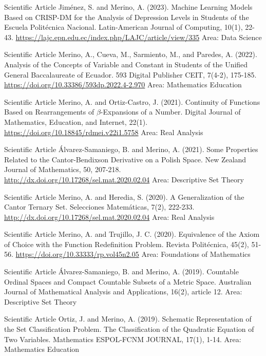 \documentclass[
    a4paper,
    maincolor=cvblue!70!blue,
    sidecolor=gray!30,
    sectioncolor=cvblue!70!blue,
    sidebarwidth=7.5cm,
    topbottommargin=20pt,
    leftrightmargin=20pt,
]{fortysecondscv}
\begin{document}
    {Scientific Article}
    {Jiménez, S. and Merino, A. (2023). Machine Learning Models Based on CRISP-DM for the Analysis of Depression Levels in Students of the Escuela Politécnica Nacional. Latin-American Journal of Computing, 10(1), 22-43.}     
    {\url{https://lajc.epn.edu.ec/index.php/LAJC/article/view/335}}
    {Area: Data Science}
    
    {Scientific Article}
    {Merino, A., Cueva, M., Sarmiento, M., and Paredes, A. (2022). Analysis of the Concepts of Variable and Constant in Students of the Unified General Baccalaureate of Ecuador. 593 Digital Publisher CEIT, 7(4-2), 175-185.}     
    {\url{https://doi.org/10.33386/593dp.2022.4-2.970}}
    {Area: Mathematics Education}
    
    {Scientific Article}
    {Merino, A. and Ortiz-Castro, J. (2021). Continuity of Functions Based on Rearrangements of $\beta$-Expansions of a Number. Digital Journal of Mathematics, Education, and Internet, 22(1).}     
    {\url{https://doi.org/10.18845/rdmei.v22i1.5758}}
    {Area: Real Analysis}
    
    {Scientific Article}
    {Álvarez-Samaniego, B. and Merino, A. (2021). Some Properties Related to the Cantor-Bendixson Derivative on a Polish Space. New Zealand Journal of Mathematics, 50, 207-218.}     {\url{http://dx.doi.org/10.17268/sel.mat.2020.02.04}}
    {Area: Descriptive Set Theory}
    
    {Scientific Article}
    {Merino, A. and Heredia, S. (2020). A Generalization of the Cantor Ternary Set. Selecciones Matemáticas, 7(2), 222-233.}     {\url{http://dx.doi.org/10.17268/sel.mat.2020.02.04}}
    {Area: Real Analysis}
    
    {Scientific Article}
    {Merino, A. and Trujillo, J. C. (2020). Equivalence of the Axiom of Choice with the Function Redefinition Problem. Revista Politécnica, 45(2), 51-56.}     
    {\url{https://doi.org/10.33333/rp.vol45n2.05}}
    {Area: Foundations of Mathematics}
    
    {Scientific Article}
    {Álvarez-Samaniego, B. and Merino, A. (2019). Countable Ordinal Spaces and Compact Countable Subsets of a Metric Space. Australian Journal of Mathematical Analysis and Applications, 16(2), article 12.}
    {}
    {Area: Descriptive Set Theory}
    
    {Scientific Article}
    {Ortiz, J. and Merino, A. (2019). Schematic Representation of the Set Classification Problem. The Classification of the Quadratic Equation of Two Variables. Mathematics ESPOL-FCNM JOURNAL, 17(1), 1-14.}
    {}
    {Area: Mathematics Education}
    
\end{document}

